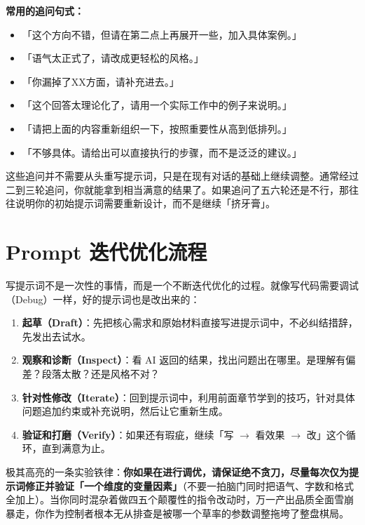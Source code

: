 \textbf{常用的追问句式：}

\begin{itemize}
  \item 「这个方向不错，但请在第二点上再展开一些，加入具体案例。」
  \item 「语气太正式了，请改成更轻松的风格。」
  \item 「你漏掉了XX方面，请补充进去。」
  \item 「这个回答太理论化了，请用一个实际工作中的例子来说明。」
  \item 「请把上面的内容重新组织一下，按照重要性从高到低排列。」
  \item 「不够具体。请给出可以直接执行的步骤，而不是泛泛的建议。」
\end{itemize}

这些追问并不需要从头重写提示词，只是在现有对话的基础上继续调整。通常经过二到三轮追问，你就能拿到相当满意的结果了。如果追问了五六轮还是不行，那往往说明你的初始提示词需要重新设计，而不是继续「挤牙膏」。

\section{Prompt 迭代优化流程}

写提示词不是一次性的事情，而是一个不断迭代优化的过程。就像写代码需要调试（Debug）一样，好的提示词也是改出来的：

\begin{enumerate}
  \item \textbf{起草（Draft）}：先把核心需求和原始材料直接写进提示词中，不必纠结措辞，先发出去试水。
  \item \textbf{观察和诊断（Inspect）}：看 AI 返回的结果，找出问题出在哪里。是理解有偏差？段落太散？还是风格不对？
  \item \textbf{针对性修改（Iterate）}：回到提示词中，利用前面章节学到的技巧，针对具体问题追加约束或补充说明，然后让它重新生成。
  \item \textbf{验证和打磨（Verify）}：如果还有瑕疵，继续「写 $\to$ 看效果 $\to$ 改」这个循环，直到满意为止。
\end{enumerate}

\begin{tipbox}
极其高亮的一条实验铁律：\textbf{你如果在进行调优，请保证绝不贪刀，尽量每次仅为提示词修正并验证「一个维度的变量因素」}（不要一拍脑门同时把语气、字数和格式全加上）。当你同时混杂着做四五个颠覆性的指令改动时，万一产出品质全面雪崩暴走，你作为控制者根本无从排查是被哪一个草率的参数调整拖垮了整盘棋局。
\end{tipbox}

